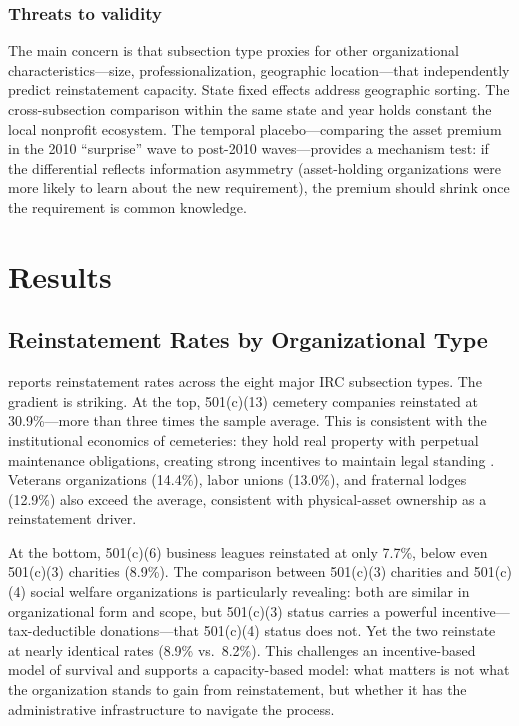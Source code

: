 \documentclass[12pt]{article}
\begin{document}
\subsubsection*{Threats to validity} The main concern is that subsection type proxies for other organizational characteristics---size, professionalization, geographic location---that independently predict reinstatement capacity. State fixed effects address geographic sorting. The cross-subsection comparison within the same state and year holds constant the local nonprofit ecosystem. The temporal placebo---comparing the asset premium in the 2010 ``surprise'' wave to post-2010 waves---provides a mechanism test: if the differential reflects information asymmetry (asset-holding organizations were more likely to learn about the new requirement), the premium should shrink once the requirement is common knowledge.

\section{Results}

\subsection{Reinstatement Rates by Organizational Type}

 reports reinstatement rates across the eight major IRC subsection types. The gradient is striking. At the top, 501(c)(13) cemetery companies reinstated at 30.9\%---more than three times the sample average. This is consistent with the institutional economics of cemeteries: they hold real property with perpetual maintenance obligations, creating strong incentives to maintain legal standing \citep{harris2007cemetery}. Veterans organizations (14.4\%), labor unions (13.0\%), and fraternal lodges (12.9\%) also exceed the average, consistent with physical-asset ownership as a reinstatement driver.

At the bottom, 501(c)(6) business leagues reinstated at only 7.7\%, below even 501(c)(3) charities (8.9\%). The comparison between 501(c)(3) charities and 501(c)(4) social welfare organizations is particularly revealing: both are similar in organizational form and scope, but 501(c)(3) status carries a powerful incentive---tax-deductible donations---that 501(c)(4) status does not. Yet the two reinstate at nearly identical rates (8.9\% vs.\ 8.2\%). This challenges an incentive-based model of survival and supports a capacity-based model: what matters is not what the organization stands to gain from reinstatement, but whether it has the administrative infrastructure to navigate the process.
\end{document}
